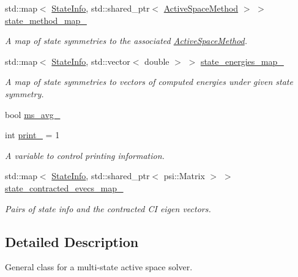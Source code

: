 \begin{DoxyCompactItemize}
std\+::map$<$ \mbox{\hyperlink{classforte_1_1_state_info}{State\+Info}}, std\+::shared\+\_\+ptr$<$ \mbox{\hyperlink{classforte_1_1_active_space_method}{Active\+Space\+Method}} $>$ $>$ \mbox{\hyperlink{classforte_1_1_active_space_solver_a0f0a070d97a0ccf46e2c4103eaecf416}{state\+\_\+method\+\_\+map\+\_\+}}
\begin{DoxyCompactList}\small\item\em A map of state symmetries to the associated \mbox{\hyperlink{classforte_1_1_active_space_method}{Active\+Space\+Method}}. \end{DoxyCompactList}\item 
std\+::map$<$ \mbox{\hyperlink{classforte_1_1_state_info}{State\+Info}}, std\+::vector$<$ double $>$ $>$ \mbox{\hyperlink{classforte_1_1_active_space_solver_a5586d712e35c7c36ad53ddb399cb8dcb}{state\+\_\+energies\+\_\+map\+\_\+}}
\begin{DoxyCompactList}\small\item\em A map of state symmetries to vectors of computed energies under given state symmetry. \end{DoxyCompactList}\item 
bool \mbox{\hyperlink{classforte_1_1_active_space_solver_a57db6210c31056c68d05a3aed518dacf}{ms\+\_\+avg\+\_\+}}
\item 
int \mbox{\hyperlink{classforte_1_1_active_space_solver_a00a665e5f842845a03aad95d4e4050a8}{print\+\_\+}} = 1
\begin{DoxyCompactList}\small\item\em A variable to control printing information. \end{DoxyCompactList}\item 
std\+::map$<$ \mbox{\hyperlink{classforte_1_1_state_info}{State\+Info}}, std\+::shared\+\_\+ptr$<$ psi\+::\+Matrix $>$ $>$ \mbox{\hyperlink{classforte_1_1_active_space_solver_af79b71466a6e515d969a1312e35de3be}{state\+\_\+contracted\+\_\+evecs\+\_\+map\+\_\+}}
\begin{DoxyCompactList}\small\item\em Pairs of state info and the contracted CI eigen vectors. \end{DoxyCompactList}\end{DoxyCompactItemize}


\subsection{Detailed Description}
General class for a multi-\/state active space solver. 

